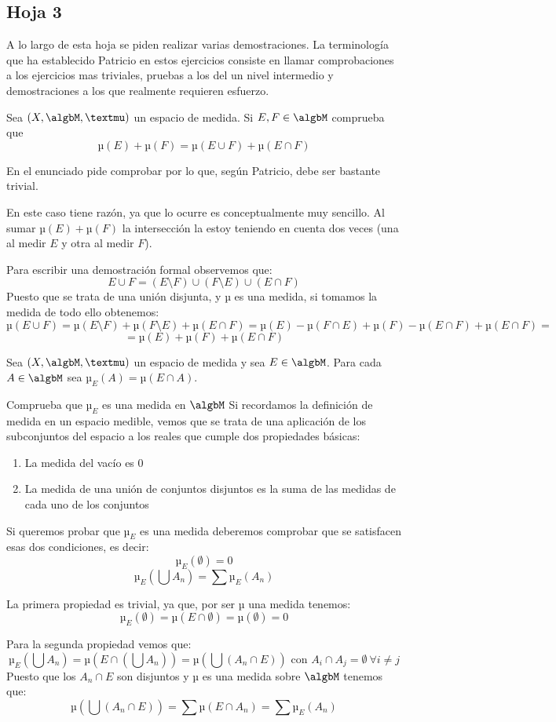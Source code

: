 \subsection{Hoja 3}
A lo largo de esta hoja se piden realizar varias demostraciones. La terminología que ha establecido Patricio en estos ejercicios consiste en llamar comprobaciones a los ejercicios mas triviales, pruebas a los del un nivel intermedio y demostraciones a los que realmente requieren esfuerzo.

\begin{problem}
Sea $(X, \algbM, µ)$ un espacio de medida. Si $E,F \in \algbM$ comprueba que
\[µ(E)+µ(F)=µ(E\cup F) + µ (E\cap F)\]

\solution
En el enunciado pide comprobar por lo que, según Patricio, debe ser bastante trivial.

En este caso tiene razón, ya que lo ocurre es conceptualmente muy sencillo. Al sumar $µ(E)+µ(F)$ la intersección la estoy teniendo en cuenta dos veces (una al medir $E$ y otra al medir $F$).

Para escribir una demostración formal observemos que:
\[E \cup F = (E \setminus F) \cup (F\setminus E) \cup (E \cap F)\]
Puesto que se trata de una unión disjunta, y µ es una medida, si tomamos la medida de todo ello obtenemos:
\[µ(E \cup F) = µ(E \setminus F) + µ(F\setminus E) + µ(E \cap F) = µ(E)-µ(F\cap E)+µ(F)-µ(E \cap F)+µ(E \cap F) =\]
\[= µ(E) + µ (F) +µ (E \cap F)\]
\end{problem}

\begin{problem}
Sea $(X, \algbM, µ)$ un espacio de medida y sea $E \in \algbM$. Para cada $A \in \algbM$ sea $µ_E(A)=µ(E\cap A)$.

Comprueba que $µ_E$ es una medida en $\algbM$
\solution
Si recordamos la definición de medida en un espacio medible, vemos que se trata de una aplicación de los subconjuntos del espacio a los reales que cumple dos propiedades básicas:
\begin{enumerate}
\item La medida del vacío es 0
\item La medida de una unión de conjuntos disjuntos es la suma de las medidas de cada uno de los conjuntos
\end{enumerate}

Si queremos probar que $µ_E$ es una medida deberemos comprobar que se satisfacen esas dos condiciones, es decir:
\[µ_E(\emptyset) = 0\]
\[µ_E(\bigcup A_n) = \sum µ_E(A_n)\]

La primera propiedad es trivial, ya que, por ser µ una medida tenemos:
\[µ_E(\emptyset)=µ(E \cap \emptyset)=µ(\emptyset)=0\]

Para la segunda propiedad vemos que:
\[µ_E(\bigcup A_n)=µ(E \cap (\bigcup A_n)) = µ(\bigcup(A_n \cap E)) \text{ con } A_i\cap A_j = \emptyset \ \forall i\neq j\]
Puesto que los $A_n \cap E$ son disjuntos y $µ$ es una medida sobre $\algbM$ tenemos que:
\[µ(\bigcup(A_n \cap E))=\sum µ(E \cap A_n) = \sum µ_E(A_n)\]

\end{problem}

